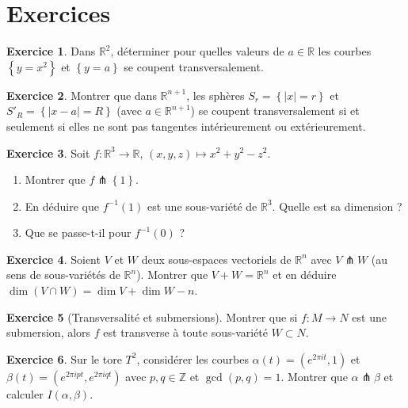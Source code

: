 \documentclass[12pt,a4paper,openany]{book}
\theoremstyle{definition}
\newtheorem{exercice}{Exercice}[chapter]
\theoremstyle{plain}
\theoremstyle{remark}
\newcommand{\Z}{\mathbb{Z}}
\newcommand{\R}{\mathbb{R}}
\newcommand{\abs}[1]{\left|#1\right|}
\newcommand{\set}[1]{\left\{#1\right\}}
\begin{document}
\section{Exercices}\label{sec:exo-transversalite}

\begin{exercice}\label{exo:transverse-courbes-R2}
Dans $\R^2$, déterminer pour quelles valeurs de $a \in \R$ les courbes
$\set{y = x^2}$ et $\set{y = a}$ se coupent transversalement.
\end{exercice}

\begin{exercice}\label{exo:transverse-spheres}
Montrer que dans $\R^{n+1}$, les sphères
$S_r = \set{\abs{x} = r}$ et $S'_R = \set{\abs{x - a} = R}$
(avec $a \in \R^{n+1}$) se coupent transversalement si et seulement si
elles ne sont pas tangentes intérieurement ou extérieurement.
\end{exercice}

\begin{exercice}\label{exo:preimage-transverse-cercle}
Soit $f \colon \R^3 \to \R$, $(x, y, z) \mapsto x^2 + y^2 - z^2$.
\begin{enumerate}[label=\textup{(\alph*)}]
  \item Montrer que $f \pitchfork \set{1}$.
  \item En déduire que $f^{-1}(1)$ est une sous-variété de $\R^3$.
    Quelle est sa dimension ?
  \item Que se passe-t-il pour $f^{-1}(0)$ ?
\end{enumerate}
\end{exercice}

\begin{exercice}\label{exo:codimension-intersection}
Soient $V$ et $W$ deux sous-espaces vectoriels de $\R^n$ avec
$V \pitchfork W$ (au sens de sous-variétés de $\R^n$). Montrer que
$V + W = \R^n$ et en déduire
$\dim(V \cap W) = \dim V + \dim W - n$.
\end{exercice}

\begin{exercice}[Transversalité et submersions]\label{exo:submersion-transverse}
Montrer que si $f \colon M \to N$ est une submersion, alors $f$ est
transverse à toute sous-variété $W \subset N$.
\end{exercice}

\begin{exercice}\label{exo:intersection-tore}
Sur le tore $T^2$, considérer les courbes
$\alpha(t) = (e^{2\pi i t}, 1)$ et
$\beta(t) = (e^{2\pi i p t}, e^{2\pi i q t})$ avec $p, q \in \Z$
et $\gcd(p, q) = 1$. Montrer que $\alpha \pitchfork \beta$ et
calculer $I(\alpha, \beta)$.
\end{exercice}
\end{document}
